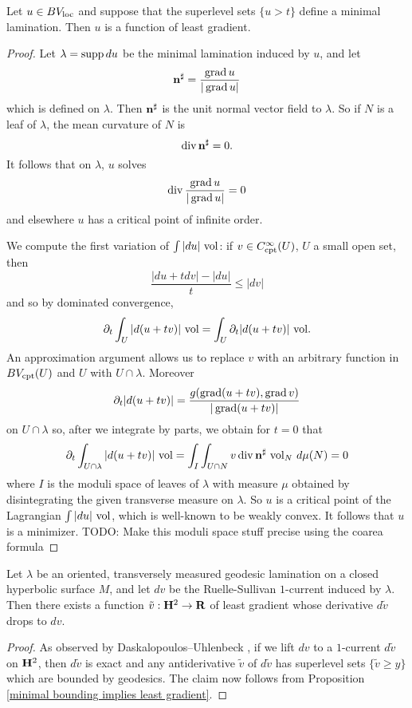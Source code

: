 \begin{proposition}\label{minimal bounding implies least gradient}
Let $u \in BV_{\mathrm{loc}}$ and suppose that the superlevel sets $\{u > t\}$ define a minimal lamination.
Then $u$ is a function of least gradient.
\end{proposition}
\begin{proof}
Let $\lambda = \operatorname{supp} du$ be the minimal lamination induced by $u$, and let
$$\mathbf n^\sharp = \frac{\operatorname{grad} u}{|\operatorname{grad} u|}$$
which is defined on $\lambda$. Then $\mathbf n^\sharp$ is the unit normal vector field to $\lambda$.
So if $N$ is a leaf of $\lambda$, the mean curvature of $N$ is
$$\operatorname{div} \mathbf n^\sharp = 0.$$
It follows that on $\lambda$, $u$ solves
$$\operatorname{div} \frac{\operatorname{grad} u}{|\operatorname{grad} u|} = 0$$
and elsewhere $u$ has a critical point of infinite order.

We compute the first variation of $\int |du| ~\mathrm{vol}$: if $v \in C^\infty_{\mathrm{cpt}}(U)$, $U$ a small open set, then
$$\frac{|du + tdv| - |du|}{t} \leq |dv|$$
and so by dominated convergence,
$$\partial_t \int_U |d(u + tv)| ~\mathrm{vol} = \int_U \partial_t |d(u + tv)| ~\mathrm{vol}.$$
An approximation argument allows us to replace $v$ with an arbitrary function in $BV_{\mathrm{cpt}}(U)$ and $U$ with $U \cap \lambda$.
Moreover
$$\partial_t |d(u + tv)| = \frac{g (\operatorname{grad} (u + tv), \operatorname{grad} v)}{|\operatorname{grad} (u + tv)|}$$
on $U \cap \lambda$ so, after we integrate by parts, we obtain for $t = 0$ that
$$\partial_t \int_{U \cap \lambda} |d(u + tv)| ~\mathrm{vol} = \int_I \int_{U \cap N} v\operatorname{div} \mathbf n^\sharp ~\mathrm{vol}_N ~d\mu(N) = 0$$
where $I$ is the moduli space of leaves of $\lambda$ with measure $\mu$ obtained by disintegrating the given transverse measure on $\lambda$.
So $u$ is a critical point of the Lagrangian $\int |du| ~\mathrm{vol}$, which is well-known to be weakly convex.
It follows that $u$ is a minimizer.
TODO: Make this moduli space stuff precise using the coarea formula
\end{proof}

\begin{corollary}\label{ruelle sullivan antiderivative}
Let $\lambda$ be an oriented, transversely measured geodesic lamination on a closed hyperbolic surface $M$, and let $dv$ be the Ruelle-Sullivan $1$-current induced by $\lambda$.
Then there exists a function $\tilde v: \mathbf H^2 \to \mathbf{R}$ of least gradient whose derivative $d\tilde v$ drops to $dv$.
\end{corollary}
\begin{proof}
As observed by Daskalopoulos--Uhlenbeck \cite[\S9]{daskalopoulos2020transverse}, if we lift $dv$ to a $1$-current $d\tilde v$ on $\mathbf H^2$, then $d\tilde v$ is exact and any antiderivative $\tilde v$ of $d\tilde v$ has superlevel sets $\{\tilde v \geq y\}$ which are bounded by geodesics.
The claim now follows from Proposition \ref{minimal bounding implies least gradient}.
\end{proof}

